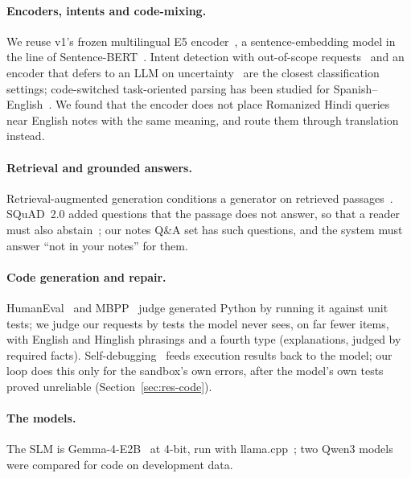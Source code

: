 \documentclass[11pt,a4paper]{article}
\begin{document}
\paragraph{Encoders, intents and code-mixing.} We reuse v1's frozen multilingual E5 encoder~\citep{wang2024me5}, a
sentence-embedding model in the line of Sentence-BERT~\citep{reimers2019sbert}. Intent detection with out-of-scope
requests~\citep{larson2019clinc} and an encoder that defers to an LLM on uncertainty~\citep{arora2024intentllm} are the
closest classification settings; code-switched task-oriented parsing has been studied for
Spanish--English~\citep{einolghozati2021cstop}. We found that the encoder does not place Romanized Hindi queries near
English notes with the same meaning, and route them through translation instead.

\paragraph{Retrieval and grounded answers.} Retrieval-augmented generation conditions a generator on retrieved
passages~\citep{lewis2020rag}. SQuAD~2.0 added questions that the passage does not answer, so that a reader must also
abstain~\citep{rajpurkar2018squad2}; our notes Q\&A set has such questions, and the system must answer ``not in your
notes'' for them.

\paragraph{Code generation and repair.} HumanEval~\citep{chen2021codex} and MBPP~\citep{austin2021mbpp} judge
generated Python by running it against unit tests; we judge our requests by tests the model never sees, on far fewer
items, with English and Hinglish phrasings and a fourth type (explanations, judged by required facts). Self-debugging~\citep{chen2024selfdebug} feeds
execution results back to the model; our loop does this only for the sandbox's own errors, after the model's own tests
proved unreliable (Section~\ref{sec:res-code}).

\paragraph{The models.} The SLM is Gemma-4-E2B~\citep{gemma4} at 4-bit, run with llama.cpp~\citep{llamacpp}; two
Qwen3 models~\citep{yang2025qwen3} were compared for code on development data.

\end{document}
